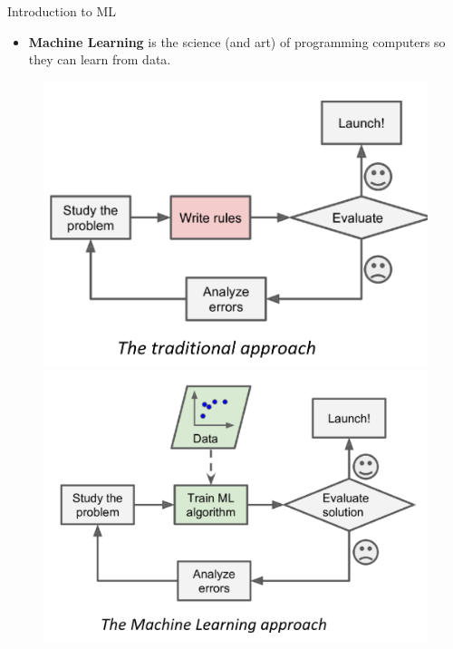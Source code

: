\begin{frame}{Introduction to ML}
    \begin{itemize}
        \item \textbf{Machine Learning} is the science (and art) of programming computers so they can learn from data.
    \end{itemize}
    \begin{figure}
        \centering
        \begin{minipage}{0.48\textwidth}
            \centering
            \includegraphics[width=\linewidth]{images/linear-regression/linear-regression-1.png}
        \end{minipage}
        \hfill
        \begin{minipage}{0.48\textwidth}
            \centering
            \includegraphics[width=\linewidth]{images/linear-regression/linear-regression-2.png}
        \end{minipage}
    \end{figure}
\end{frame}


